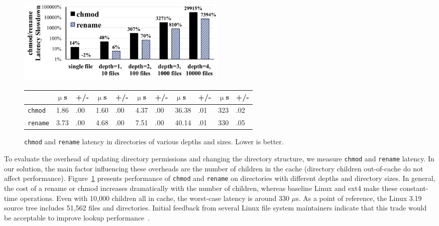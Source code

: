 \begin{figure}[t!]
\scriptsize
\centering
\begin{minipage}{4in}
\raggedleft
\includegraphics[width=4in]{dcache/plots/lm_chmod_rename.pdf}
{\setlength{\tabcolsep}{3pt}
\begin{tabular}{|l|R{.3in}R{.16in}|R{.3in}R{.16in}|R{.3in}R{.16in}|R{.3in}R{.16in}|R{.3in}R{.16in}|}
\hline
 & $\upmu$s & +/- & $\upmu$s & +/- & $\upmu$s & +/- & $\upmu$s & +/- & $\upmu$s & +/- \\
\hline
{\tt chmod}  & 1.86 & .00 & 1.60 & .00 & 4.37 & .00 & 36.38 & .01 & 323 & .02 \\
\hline
{\tt rename} & 3.73 & .00 & 4.68 & .00 & 7.51 & .00 & 40.14 & .01 & 330 & .05 \\
\hline
\end{tabular}}
\end{minipage}
\caption[Directory cache optimization: {\tt chmod} and {\tt rename} latency.]
{{\tt chmod} and {\tt rename} latency in directories of various depths and sizes. Lower is better.}
\label{fig:dcache:chmod-rename}
\end{figure}

To evaluate the overhead of updating directory permissions and changing the directory structure,
we measure {\tt chmod} and {\tt rename} latency.
In our solution, the main factor influencing these overheads are the number of children
in the cache (directory children out-of-cache do not affect performance).
Figure~\ref{fig:dcache:chmod-rename} presents
performance of {\tt chmod} and {\tt rename}  on directories with different depths and directory sizes.
In general, the cost of a rename or chmod increases dramatically with the number of children,
whereas baseline Linux and ext4 make these constant-time operations.
Even with 10,000 children all in cache, the worst-case latency is around 330 $\mu$s.
As a point of reference, the Linux 3.19 source tree includes 51,562 files and directories.
Initial feedback from several Linux file system maintainers indicate that this trade would be acceptable
to improve lookup performance~\citep{linux-forum}.

